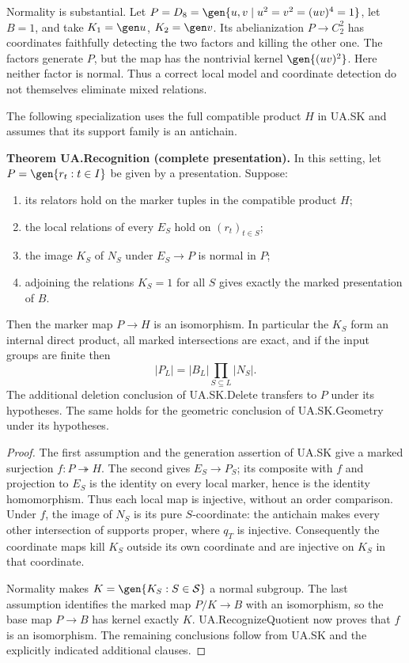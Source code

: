 Normality is substantial. Let $P=D_8=\gen{u,v\mid u^2=v^2=(uv)^4=1}$,
let $B=1$, and take $K_1=\gen u$, $K_2=\gen v$. Its abelianization
$P\to C_2^2$ has coordinates faithfully detecting the two factors and killing
the other one. The factors generate $P$, but the map has the nontrivial kernel
$\gen{(uv)^2}$. Here neither factor is normal. Thus a correct local model and
coordinate detection do not themselves eliminate mixed relations.

The following specialization uses the full compatible product $H$ in
UA.SK and assumes that its support family is an antichain.

\textbf{Theorem UA.Recognition (complete presentation).}
In this setting, let $P=\gen{r_t:t\in I}$ be given by a
presentation. Suppose:
\begin{enumerate}
\item its relators hold on the marker tuples in the compatible product $H$;
\item the local relations of every $E_S$ hold on $(r_t)_{t\in S}$;
\item the image $K_S$ of $N_S$ under $E_S\to P$ is normal in $P$;
\item adjoining the relations $K_S=1$ for all $S$ gives exactly the marked
presentation of $B$.
\end{enumerate}
Then the marker map $P\to H$ is an isomorphism. In particular the $K_S$
form an internal direct product, all marked intersections are exact, and if
the input groups are finite then
\begin{equation}
 |P_L|=|B_L|\prod_{S\subseteq L}|N_S|.                         \label{eq:orders}
\end{equation}
The additional deletion conclusion of UA.SK.Delete transfers to $P$ under
its hypotheses. The same holds for the geometric conclusion of
UA.SK.Geometry under its hypotheses.

\begin{proof}
The first assumption and the generation assertion of UA.SK give a marked
surjection $f:P\twoheadrightarrow H$. The second gives $E_S\to P_S$;
its composite with $f$ and projection to $E_S$ is the identity on every
local marker, hence is the identity homomorphism. Thus each local map is
injective, without an order comparison. Under $f$, the image of $N_S$ is
its pure $S$-coordinate: the antichain makes every other intersection of
supports proper, where $q_T$ is injective. Consequently the coordinate maps
kill $K_S$ outside its own coordinate and are injective on $K_S$ in that
coordinate.

Normality makes $K=\gen{K_S:S\in\mathcal S}$ a normal subgroup. The last
assumption identifies the marked map $P/K\to B$ with an isomorphism, so
the base map $P\to B$ has kernel exactly $K$. UA.RecognizeQuotient
now proves that $f$ is an isomorphism. The remaining conclusions follow
from UA.SK and the explicitly indicated additional clauses.
\end{proof}


